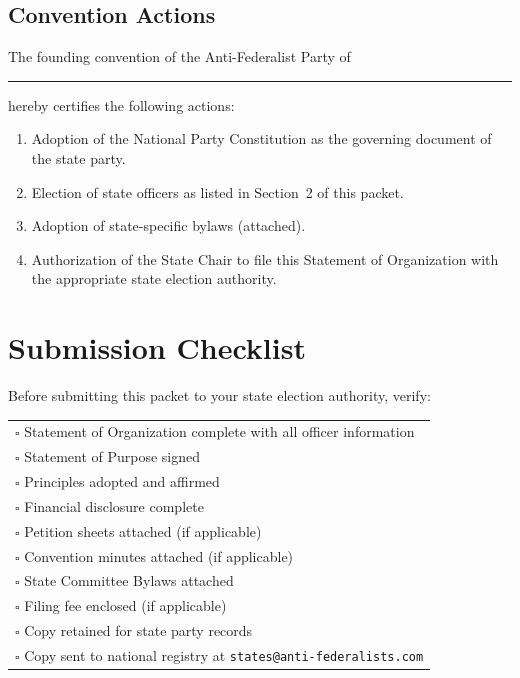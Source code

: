\documentclass[11pt, letterpaper]{article}
\begin{document}


\subsection{Convention Actions}

The founding convention of the Anti-Federalist Party of \rule{4cm}{0.4pt} hereby certifies the following actions:

\begin{enumerate}
  \item Adoption of the National Party Constitution as the governing document of the state party.
  \item Election of state officers as listed in Section~2 of this packet.
  \item Adoption of state-specific bylaws (attached).
  \item Authorization of the State Chair to file this Statement of Organization with the appropriate state election authority.
\end{enumerate}



\newpage

\section{Submission Checklist}

Before submitting this packet to your state election authority, verify:

\noindent
\begin{tabular}{@{}l@{}}
$\square$ \quad Statement of Organization complete with all officer information \\[0.5em]
$\square$ \quad Statement of Purpose signed \\[0.5em]
$\square$ \quad Principles adopted and affirmed \\[0.5em]
$\square$ \quad Financial disclosure complete \\[0.5em]
$\square$ \quad Petition sheets attached (if applicable) \\[0.5em]
$\square$ \quad Convention minutes attached (if applicable) \\[0.5em]
$\square$ \quad State Committee Bylaws attached \\[0.5em]
$\square$ \quad Filing fee enclosed (if applicable) \\[0.5em]
$\square$ \quad Copy retained for state party records \\[0.5em]
$\square$ \quad Copy sent to national registry at \texttt{states@anti-federalists.com} \\
\end{tabular}
\end{document}
